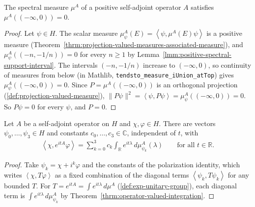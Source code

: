 \begin{lemma}
    \label{lmm:positive-spectral-support}
    \leanok
    The spectral measure $\mu^A$ of a positive self-adjoint operator $A$ satisfies $\mu^A((-\infty, 0)) = 0$.
\end{lemma}
\begin{proof}
    \leanok
    Let $\psi \in H$. The scalar measure $\mu^A_\psi(E) = \left< \psi, \mu^A(E)\psi \right>$ is a positive measure (Theorem~\ref{thrm:projection-valued-measures-associated-measure}), and $\mu^A_\psi((-n, -1/n)) = 0$ for every $n \ge 1$ by Lemma~\ref{lmm:positive-spectral-support-interval}. The intervals $(-n, -1/n)$ increase to $(-\infty, 0)$, so continuity of measures from below (in Mathlib, \texttt{tendsto\_measure\_iUnion\_atTop}) gives $\mu^A_\psi((-\infty, 0)) = 0$. Since $P = \mu^A((-\infty, 0))$ is an orthogonal projection (\ref{def:projection-valued-measure}), $\|P\psi\|^2 = \left< \psi, P\psi \right> = \mu^A_\psi((-\infty, 0)) = 0$. So $P\psi = 0$ for every $\psi$, and $P = 0$.
\end{proof}

\begin{lemma}
    \label{lmm:exp-matrix-coefficient-polarization}
    \leanok
    Let $A$ be a self-adjoint operator on $H$ and $\chi, \varphi \in H$. There are vectors $\psi_0, \dots, \psi_3 \in H$ and constants $c_0, \dots, c_3 \in \mathbb{C}$, independent of $t$, with
    \begin{align}
        \left< \chi, e^{itA}\varphi \right> = \sum_{k=0}^{3} c_k \int_{\mathbb{R}} e^{it\lambda} \, d\mu^A_{\psi_k}(\lambda) \qquad \text{for all } t \in \mathbb{R}.
    \end{align}
\end{lemma}
\begin{proof}
    \leanok
    Take $\psi_k = \chi + i^k\varphi$ and the constants of the polarization identity, which writes $\left< \chi, T\varphi \right>$ as a fixed combination of the diagonal terms $\left< \psi_k, T\psi_k \right>$ for any bounded $T$. For $T = e^{itA} = \int e^{it\lambda} \, d\mu^A$ (\ref{def:exp-unitary-group}), each diagonal term is $\int e^{it\lambda} \, d\mu^A_{\psi_k}$ by Theorem~\ref{thrm:operator-valued-integration}.
\end{proof}

